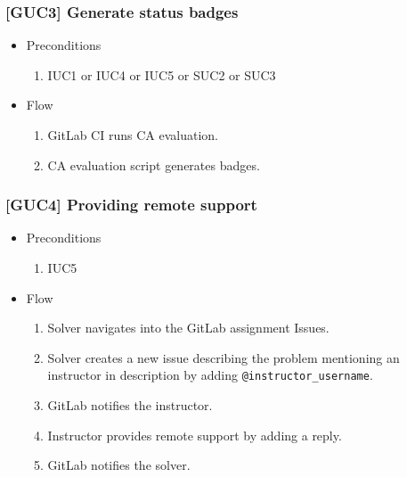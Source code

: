 \subsubsection{{[}GUC3{]} Generate status badges}

\begin{itemize}
\item
  {Preconditions}
    \begin{enumerate}
    \item
      {IUC1 or IUC4 or IUC5 or SUC2 or SUC3}
    \end{enumerate}
\end{itemize}

\begin{itemize}
\item
  {Flow}
    \begin{enumerate}
    \item
      {GitLab CI runs CA evaluation.}
    \item
      {CA evaluation script generates badges.}
    \end{enumerate}
\end{itemize}

\subsubsection{{[}GUC4{]} Providing remote support}

\begin{itemize}
\item
  {Preconditions}
    \begin{enumerate}
    \item
      {IUC5}
    \end{enumerate}
\end{itemize}

\begin{itemize}
\item
  {Flow}
    \begin{enumerate}
    \item
      {Solver navigates into the GitLab assignment Issues.}
    \item
      {Solver creates a new issue describing the problem mentioning an instructor in description by adding \texttt{@instructor\_username}.}
    \item
      {GitLab notifies the instructor.}
    \item
      {Instructor provides remote support by adding a reply.}
    \item
      {GitLab notifies the solver.}
    \end{enumerate}
\end{itemize}

